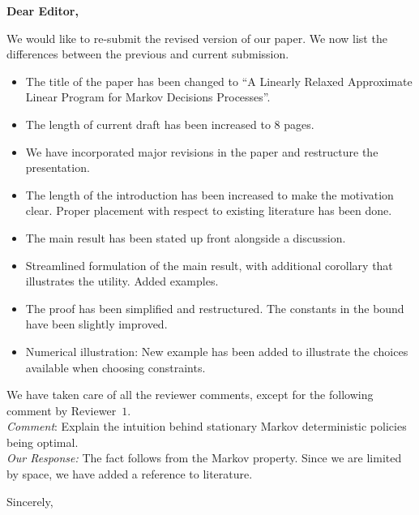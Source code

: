 \documentclass{letter}
\begin{document}

\begin{letter}{} %


\opening{\textbf{Dear Editor,}}
We would like to re-submit the revised version of our paper. We now list the differences between the previous and current submission.
\begin{itemize}
\item The title of the paper has been changed to ``A Linearly Relaxed Approximate Linear Program for Markov Decisions Processes''.
\item The length of current draft has been increased to 8 pages.
\item We have incorporated major revisions in the paper and restructure the presentation.
\item The length of the introduction has been increased to make the motivation clear. Proper placement with respect to existing literature has been done.
\item The main result has been stated up front alongside a discussion.
\item Streamlined formulation of the main result, with additional corollary that illustrates the utility. Added examples.
\item The proof has been simplified and restructured. The constants in the bound have been slightly improved.
\item Numerical illustration: New example has been added to illustrate the choices available when choosing constraints.
\end{itemize}
We have taken care of all the reviewer comments, except for the following comment by Reviewer~$1$.\\
\emph{Comment}: Explain the intuition behind stationary Markov deterministic policies being optimal.\\
\emph{Our Response:} The fact follows from the Markov property. Since we are limited by space, we have added a reference to literature.


\vspace{2\parskip} %
\closing{Sincerely,}
\vspace{2\parskip} %


\end{letter}
\end{document}
